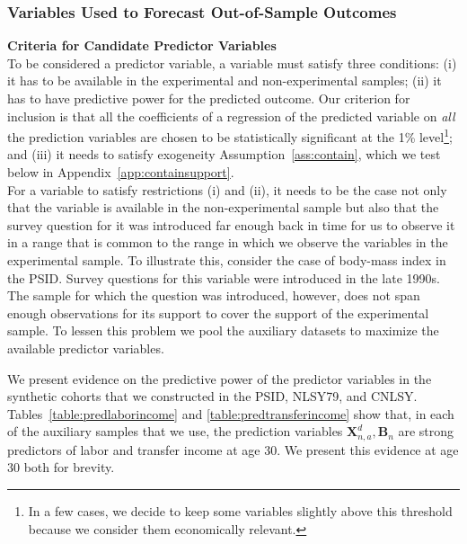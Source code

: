 \subsubsection{Variables Used to Forecast Out-of-Sample Outcomes} \label{appendix:pred}

\noindent \textbf{Criteria for Candidate Predictor Variables}\\
\noindent To be considered a predictor variable, a variable must satisfy three conditions: (i) it has to be available in the experimental and non-experimental samples; (ii) it has to have predictive power for the predicted outcome. Our criterion for inclusion is that all the coefficients of a regression of the predicted variable on \textit{all} the prediction variables are chosen to be statistically significant at the 1\% level\footnote{In a few cases, we decide to keep some variables slightly above this threshold because we consider them economically relevant.}; and (iii) it needs to satisfy exogeneity Assumption~\ref{ass:contain}, which we test below in Appendix~\ref{app:containsupport}.\\

\noindent For a variable to satisfy restrictions (i) and (ii), it needs to be the case not only that the variable is available in the non-experimental sample but also that the survey question for it was introduced far enough back in time for us to observe it in a range that is common to the range in which we observe the variables in the experimental sample. To illustrate this, consider the case of body-mass index in the PSID. Survey questions for this variable were introduced in the late 1990s. The sample for which the question was introduced, however, does not span enough observations for its support to cover the support of the experimental sample. To lessen this problem we pool the auxiliary datasets to maximize the available predictor variables.

\noindent We present evidence on the predictive power of the predictor variables in the synthetic cohorts that we constructed in the PSID, NLSY79, and CNLSY. Tables~\ref{table:predlaborincome} and \ref{table:predtransferincome} show that, in each of the auxiliary samples that we use, the prediction variables $\bm{X}_{n,a}^d, \bm{B}_n$ are strong predictors of labor and transfer income at age 30. We present this evidence at age 30 both for brevity.

